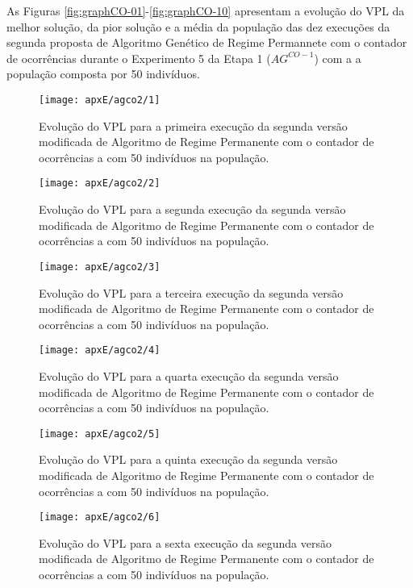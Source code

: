 As Figuras \ref{fig:graphCO-01}-\ref{fig:graphCO-10} apresentam a evolução do VPL da melhor solução, da pior solução e a média da população das dez execuções da segunda proposta de Algoritmo Genético de Regime Permannete com o contador de ocorrências durante o Experimento 5 da Etapa 1 ($AG^{CO-1}$) com a a população composta por 50 indivíduos.

\begin{figure}[H]
\centering
\texttt{[image: apxE/agco2/1]}
\caption{Evolução do VPL para a primeira execução da segunda versão modificada de Algoritmo de Regime Permanente com o contador de ocorrências a com 50 indivíduos na população.}
\label{fig:graphCO2-01}
\end{figure}

\begin{figure}[H]
\centering
\texttt{[image: apxE/agco2/2]}
\caption{Evolução do VPL para a segunda execução da segunda versão modificada de Algoritmo de Regime Permanente com o contador de ocorrências a com 50 indivíduos na população.}
\label{fig:graphCO2-02}
\end{figure}

\begin{figure}[H]
\centering
\texttt{[image: apxE/agco2/3]}
\caption{Evolução do VPL para a terceira execução da segunda versão modificada de Algoritmo de Regime Permanente com o contador de ocorrências a com 50 indivíduos na população.}
\label{fig:graphCO2-03}
\end{figure}

\begin{figure}[H]
\centering
\texttt{[image: apxE/agco2/4]}
\caption{Evolução do VPL para a quarta execução da segunda versão modificada de Algoritmo de Regime Permanente com o contador de ocorrências a com 50 indivíduos na população.}
\label{fig:graphCO2-04}
\end{figure}

\begin{figure}[H]
\centering
\texttt{[image: apxE/agco2/5]}
\caption{Evolução do VPL para a quinta execução da segunda versão modificada de Algoritmo de Regime Permanente com o contador de ocorrências a com 50 indivíduos na população.}
\label{fig:graphCO2-05}
\end{figure}

\begin{figure}[H]
\centering
\texttt{[image: apxE/agco2/6]}
\caption{Evolução do VPL para a sexta execução da segunda versão modificada de Algoritmo de Regime Permanente com o contador de ocorrências a com 50 indivíduos na população.}
\label{fig:graphCO2-06}
\end{figure}

